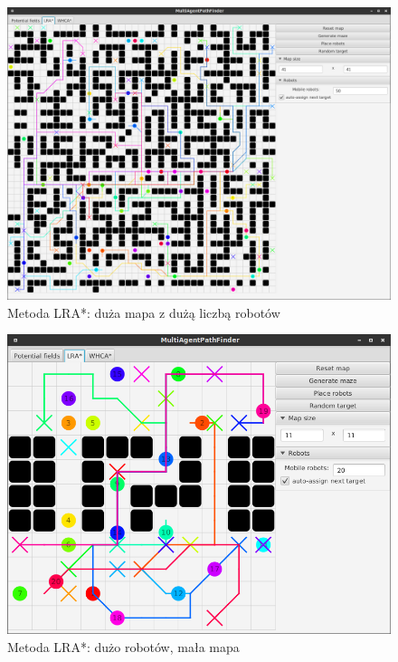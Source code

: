 \begin{figure}
	\centering
	\includegraphics[width=0.8\columnwidth]{img/robopath/lra-bigmap}
	\caption{Metoda LRA*: duża mapa z dużą liczbą robotów}
	\label{fig:test-lra-bigmap}
\end{figure}


\begin{figure}
	\centering
	\includegraphics[width=0.8\columnwidth]{img/robopath/lra-lot-robots}
	\caption{Metoda LRA*: dużo robotów, mała mapa}
	\label{fig:test-lra-lot-robots}
\end{figure}

